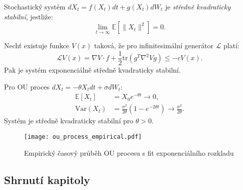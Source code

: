 \begin{definition}
Stochastický systém $dX_t = f(X_t)dt + g(X_t)dW_t$ je \emph{středně kvadraticky stabilní}, jestliže:
\[
\lim_{t \to \infty} \mathbb{E}[\|X_t\|^2] = 0.
\]
\end{definition}

\begin{theorem}
Nechť existuje funkce $V(x)$ taková, že pro infinitesimální generátor $\mathcal{L}$ platí:
\[
\mathcal{L}V(x) = \nabla V \cdot f + \frac{1}{2}\mathrm{tr}(g^T \nabla^2 V g) \leq -cV(x).
\]
Pak je systém exponenciálně středně kvadraticky stabilní.
\end{theorem}

\begin{example}
Pro OU proces $dX_t = -\theta X_t dt + \sigma dW_t$:
\begin{align*}
\mathbb{E}[X_t] &= X_0 e^{-\theta t} \to 0, \\
\mathrm{Var}(X_t) &= \frac{\sigma^2}{2\theta}(1 - e^{-2\theta t}) \to \frac{\sigma^2}{2\theta}.
\end{align*}
Systém je středně kvadraticky stabilní pro $\theta > 0$.
\end{example}

\begin{figure}[H]
\centering
\texttt{[image: ou\_process\_empirical.pdf]}
\caption{Empirický časový průběh OU procesu s fit exponenciálního rozkladu}
\label{fig:ou_empirical}
\end{figure}

\spc

\subsection*{Shrnutí kapitoly}

